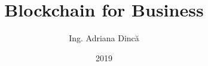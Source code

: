 \title{Blockchain for Business}
\author{Ing. Adriana Dincă}
\date{2019}


\newcommand{\project}{Hardware Supply-Chain}

